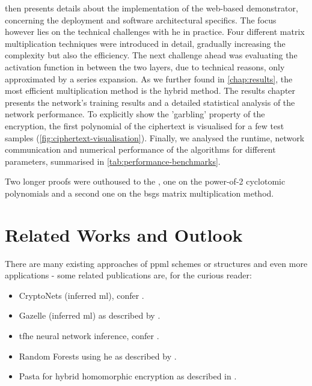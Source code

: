  then presents details about the implementation of the web-based demonstrator, concerning the deployment and software architectural specifics.
The focus however lies on the technical challenges with \glsdesc{he} in practice.
Four different matrix multiplication techniques were introduced in detail, gradually increasing the complexity but also the efficiency.
The next challenge ahead was evaluating the activation function in between the two layers, due to technical reasons, only approximated by a series expansion.
As we further found in \cref{chap:results}, the most efficient multiplication method is the hybrid method.
The results chapter presents the network's training results and a detailed statistical analysis of the network performance.
To explicitly show the 'garbling' property of the encryption, the first polynomial of the ciphertext is visualised for a few test samples (\cref{fig:ciphertext-visualisation}).
Finally, we analysed the runtime, network communication and numerical performance of the algorithms for different parameters, summarised in \cref{tab:performance-benchmarks}.

Two longer proofs were outhoused to the , one on the power-of-2 cyclotomic polynomials and a second one on the \gls{bsgs} matrix multiplication method.

\section{Related Works and Outlook}
There are many existing approaches of \gls{ppml} schemes or structures and even more applications - some related publications are, for the curious reader:
\begin{itemize}
  \item CryptoNets (inferred \gls{ml}), confer \cite{2016-cryptonets}.
  \item Gazelle (inferred \gls{ml}) as described by \cite{2018-gazelle}.
  \item \gls{tfhe} neural network inference, confer \cite{2019-tfhe-original}.
  \item Random Forests using \gls{he} as described by \cite{2020-cryptotree}.
  \item Pasta for hybrid homomorphic encryption as described in \cite{2021-pasta}.
\end{itemize}

